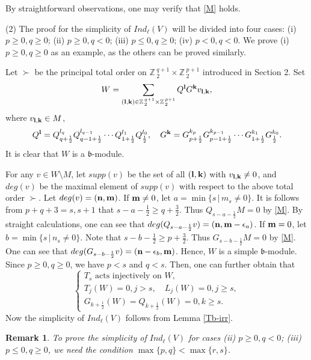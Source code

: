 \documentclass[12pt]{article}
\def\ssc{\scriptscriptstyle}
\def\Z{\mathbb{Z}{\ssc\,}}
\numberwithin{equation}{section}
\newtheorem{rema}[theo]{Remark}
\begin{document}
By straightforward observations, one may verify that \eqref{M} holds.

(2) The proof for   the simplicity of $Ind_\ell(V)$ will be divided into four cases: (i) $p\ge 0,q\ge 0$; (ii) $p\ge 0,q< 0$; (iii) $p\le 0,q\ge 0$; (iv) $p<0,q<0$. We prove   (i) $p\ge 0,q\ge 0$ as an example, as the others can be proved similarly.



 Let $\succ$ be the principal total order on $\Z_2^{q+1}\times \Z_2^{p+1}$  introduced in Section 2. Set
 $$W=\sum\limits_{({\bf l,k})\in \Z_2^{q+1}\times \Z_2^{p+1}}Q^{\bf l}G^{\bf k}v_{\bf l,k},$$
 where $v_{{\bf l,k}}\in M$, $$Q^{{\bf l}}=Q_{q+\frac{1}{2}}^{l_{q}}Q_{q-1+\frac{1}{2}}^{l_{q-1}}\cdots Q_{1+\frac{1}{2}}^{l_{1}} Q_{\frac{1}{2}}^{l_{0}}, \quad
 G^{{\bf k}}=G_{p+\frac{1}{2}}^{k_{p}}G_{p-1+\frac{1}{2}}^{k_{p-1}}\cdots G_{1+\frac{1}{2}}^{k_{1}} G_{\frac{1}{2}}^{k_{0}}.$$
It is clear that $W$ is a $\mathfrak{b}$-module.

 For any $v\in W\setminus M$, let $supp(v)$ be the set of all $(\bf l,k)$ with $v_{\bf l,k}\ne 0$, and $deg(v)$ be the maximal element of $supp(v)$ with respect to the above  total order $\succ$.  Let $deg(v)=(\bf n,m)$.
If ${\bf m}\ne 0$, let $a=\min\{s\,|\,m_s\ne 0\}$. It is follows from $p+q+3=s,s+1$ that  $s-a-\frac{1}{2}\ge q+\frac{3}{2}$. Thus $Q_{s-a-\frac{1}{2}}M=0$ by \eqref{M}. By straight calculations, one can see that $deg(Q_{s-a-\frac{1}{2}}v)=({\bf n,m}-\epsilon_a)$. If ${\bf m}=0$, let $b=\min\{s\,|\,n_s\ne 0\}$. Note that $s-b-\frac{1}{2}\ge p+\frac{3}{2}$. Thus $G_{s-b-\frac{1}{2}}M=0$ by \eqref{M}. One can see that $deg(G_{s-b-\frac{1}{2}}v)=({\bf n}-\epsilon_b,{\bf m})$. Hence,  $W$ is a simple $\mathfrak{b}$-module. Since  $p\ge 0,q\ge 0$, we have $p<s$ and $q<s$.
Then, one can further obtain that
\begin{equation}\label{W-irr}\left\{\begin{array}{l}
 T_s \mbox{ acts injectively on } W,\\
T_j(W)=0,j>s, \quad  L_j(W)=0,j\ge s,\\
 G_{k+\frac{1}{2}}(W)= Q_{k+\frac{1}{2}}(W)=0, k\ge s.\end{array}
\right.
\end{equation}
Now the simplicity of $Ind_\ell(V)$  follows from Lemma \ref{Tb-irr}.

\begin{rema}  To prove the simplicity of $Ind_\ell(V)$ for cases (ii) $p\ge 0,q< 0$; (iii) $p\le 0,q\ge 0$, we  need the condition $\max\{p,q\}<\max\{r,s\}$.
\end{rema}
\end{document}

